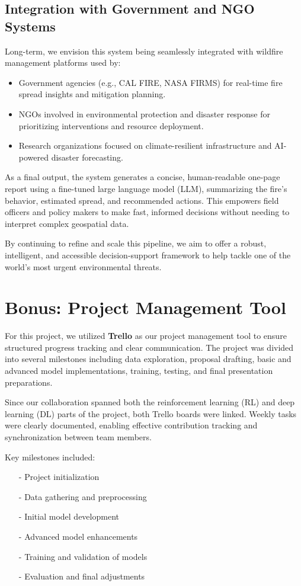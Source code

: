 \documentclass[conference]{IEEEtran}
\begin{document}
\subsection{Integration with Government and NGO Systems}
Long-term, we envision this system being seamlessly integrated with wildfire management platforms used by:

\begin{itemize}
\item Government agencies (e.g., CAL FIRE, NASA FIRMS) for real-time fire spread insights and mitigation planning.
\item NGOs involved in environmental protection and disaster response for prioritizing interventions and resource deployment.
\item Research organizations focused on climate-resilient infrastructure and AI-powered disaster forecasting.
\end{itemize}

\noindent
As a final output, the system generates a concise, human-readable one-page report using a fine-tuned large language model (LLM), summarizing the fire's behavior, estimated spread, and recommended actions. This empowers field officers and policy makers to make fast, informed decisions without needing to interpret complex geospatial data.

\noindent
By continuing to refine and scale this pipeline, we aim to offer a robust, intelligent, and accessible decision-support framework to help tackle one of the world's most urgent environmental threats.

\section{Bonus: Project Management Tool}
For this project, we utilized \textbf{Trello} as our project management tool to ensure structured progress tracking and clear communication. The project was divided into several milestones including data exploration, proposal drafting, basic and advanced model implementations, training, testing, and final presentation preparations.

Since our collaboration spanned both the reinforcement learning (RL) and deep learning (DL) parts of the project, both Trello boards were linked. Weekly tasks were clearly documented, enabling effective contribution tracking and synchronization between team members.

Key milestones included:

\begin{enumerate}
\item[-] Project initialization
\item[-] Data gathering and preprocessing
\item[-] Initial model development
\item[-] Advanced model enhancements
\item[-] Training and validation of models
\item[-] Evaluation and final adjustments
\end{enumerate}
\end{document}
